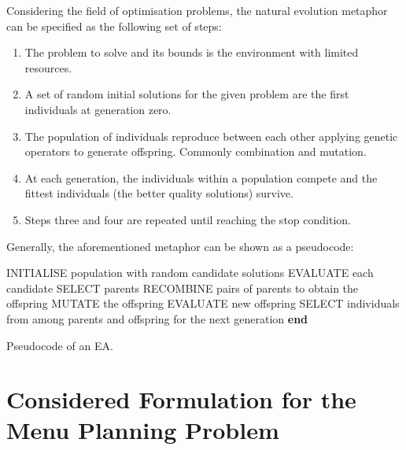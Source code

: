 Considering the field of optimisation problems, the natural evolution metaphor can be specified as the following set of steps:
\begin{enumerate}
    \item The problem to solve and its bounds is the environment with limited resources.
    \item A set of random initial solutions for the given problem are the first individuals at generation zero. 
    \item The population of individuals reproduce between each other applying genetic operators to generate offspring. Commonly combination and mutation.
    \item At each generation, the individuals within a population compete and the fittest individuals (the better quality solutions) survive.
    \item Steps three and four are repeated until reaching the stop condition.
\end{enumerate}
Generally, the aforementioned metaphor can be shown as a pseudocode\cite{eiben}:

\begin{algorithm}[H]
\begin{algorithmic}[1]
  \State INITIALISE population with random candidate solutions
  \State EVALUATE each candidate
    \State SELECT parents
    \State RECOMBINE pairs of parents to obtain the offspring
    \State MUTATE the offspring
    \State EVALUATE new offspring
    \State SELECT individuals from among parents and offspring for the next generation 
  \EndWhile
  \State \textbf{end}
  \end{algorithmic}
  \caption{Pseudocode of an EA.}
\end{algorithm}


\newpage
\section{Considered Formulation for the Menu Planning Problem}

